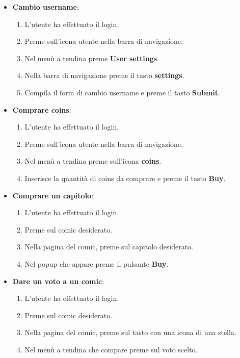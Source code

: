 \begin{itemize}
  \item \textbf{Cambio username}:
        \begin{enumerate}
          \item L'utente ha effettuato il login.
          \item Preme sull'icona utente nella barra di navigazione.
          \item Nel menù a tendina preme \textbf{User settings}.
          \item Nella barra di navigazione preme il tasto \textbf{settings}.
          \item Compila il form di cambio username e preme il tasto \textbf{Submit}.
        \end{enumerate}

  \item \textbf{Comprare coins}:
        \begin{enumerate}
          \item L'utente ha effettuato il login.
          \item Preme sull'icona utente nella barra di navigazione.
          \item Nel menù a tendina preme sull'icona \textbf{coins}.
          \item Inserisce la quantità di coins da comprare e preme il tasto \textbf{Buy}.
        \end{enumerate}

  \item \textbf{Comprare un capitolo}:
        \begin{enumerate}
          \item L'utente ha effettuato il login.
          \item Preme sul comic desiderato.
          \item Nella pagina del comic, preme sul capitolo desiderato.
          \item Nel popup che appare preme il pulsante \textbf{Buy}.
        \end{enumerate}

  \item \textbf{Dare un voto a un comic}:
        \begin{enumerate}
          \item L'utente ha effettuato il login.
          \item Preme sul comic desiderato.
          \item Nella pagina del comic, preme sul tasto con una icona di una stella.
          \item Nel menù a tendina che compare preme sul voto scelto.
        \end{enumerate}


\end{itemize}
